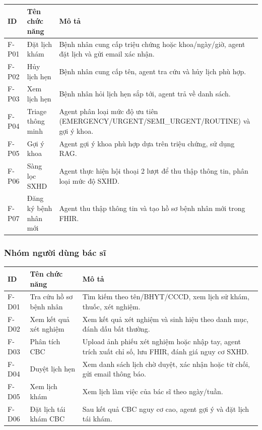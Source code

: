 \documentclass[oneside, a4paper]{book}
\theoremstyle{plain}
\theoremstyle{plain}
\theoremstyle{definition}
\theoremstyle{remark}
\begin{document}
\begin{table}[H]
\centering
\begin{tabular}{|l|p{4cm}|p{8cm}|}
\hline
\textbf{ID} & \textbf{Tên chức năng} & \textbf{Mô tả} \\
\hline
F-P01 & Đặt lịch khám & Bệnh nhân cung cấp triệu chứng hoặc khoa/ngày/giờ, agent đặt lịch và gửi email xác nhận. \\
F-P02 & Hủy lịch hẹn & Bệnh nhân cung cấp tên, agent tra cứu và hủy lịch phù hợp. \\
F-P03 & Xem lịch hẹn & Bệnh nhân hỏi lịch hẹn sắp tới, agent trả về danh sách. \\
F-P04 & Triage thông minh & Agent phân loại mức độ ưu tiên (EMERGENCY/URGENT/SEMI\_URGENT/ROUTINE) và gợi ý khoa. \\
F-P05 & Gợi ý khoa & Agent gợi ý khoa phù hợp dựa trên triệu chứng, sử dụng RAG. \\
F-P06 & Sàng lọc SXHD & Agent thực hiện hội thoại 2 lượt để thu thập thông tin, phân loại mức độ SXHD. \\
F-P07 & Đăng ký bệnh nhân mới & Agent thu thập thông tin và tạo hồ sơ bệnh nhân mới trong FHIR. \\
\hline
\end{tabular}
\end{table}

\subsubsection{Nhóm người dùng bác sĩ}

\begin{table}[H]
\centering
\begin{tabular}{|l|p{4cm}|p{8cm}|}
\hline
\textbf{ID} & \textbf{Tên chức năng} & \textbf{Mô tả} \\
\hline
F-D01 & Tra cứu hồ sơ bệnh nhân & Tìm kiếm theo tên/BHYT/CCCD, xem lịch sử khám, thuốc, xét nghiệm. \\
F-D02 & Xem kết quả xét nghiệm & Xem kết quả xét nghiệm và sinh hiệu theo danh mục, đánh dấu bất thường. \\
F-D03 & Phân tích CBC & Upload ảnh phiếu xét nghiệm hoặc nhập tay, agent trích xuất chỉ số, lưu FHIR, đánh giá nguy cơ SXHD. \\
F-D04 & Duyệt lịch hẹn & Xem danh sách lịch chờ duyệt, xác nhận hoặc từ chối, gửi email thông báo. \\
F-D05 & Xem lịch khám & Xem lịch làm việc của bác sĩ theo ngày/tuần. \\
F-D06 & Đặt lịch tái khám CBC & Sau kết quả CBC nguy cơ cao, agent gợi ý và đặt lịch tái khám. \\
\hline
\end{tabular}
\end{table}
\end{document}

